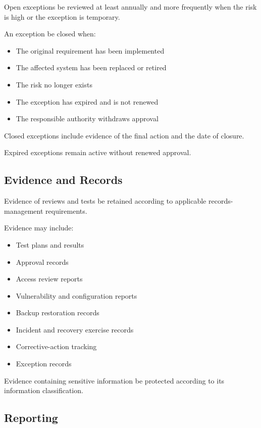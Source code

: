 Open exceptions \must{} be reviewed at least annually and more frequently when the risk is high or the exception is temporary.

An exception \must{} be closed when:
\begin{itemize}
    \item The original requirement has been implemented
    \item The affected system has been replaced or retired
    \item The risk no longer exists
    \item The exception has expired and is not renewed
    \item The responsible authority withdraws approval
\end{itemize}

Closed exceptions \should{} include evidence of the final action and the date of closure.

Expired exceptions \mustnot{} remain active without renewed approval.

\subsection{Evidence and Records}

Evidence of reviews and tests \must{} be retained according to applicable records-management requirements.

Evidence may include:
\begin{itemize}
    \item Test plans and results
    \item Approval records
    \item Access review reports
    \item Vulnerability and configuration reports
    \item Backup restoration records
    \item Incident and recovery exercise records
    \item Corrective-action tracking
    \item Exception records
\end{itemize}

Evidence containing sensitive information \must{} be protected according to its information classification.

\subsection{Reporting}

